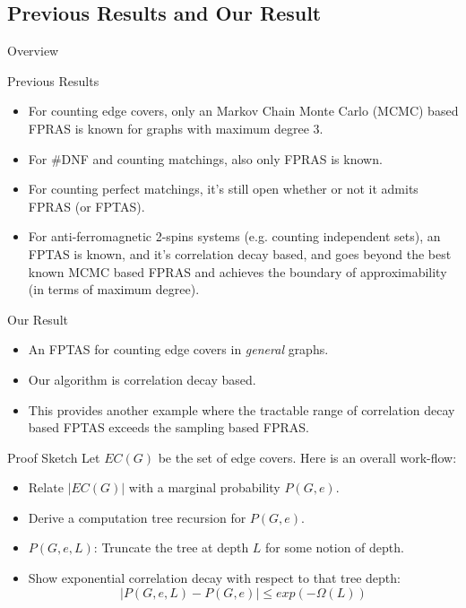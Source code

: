 \documentclass[mathserif]{beamer}
\newcommand{\abs}[1]{\left\vert#1\right\vert}
\begin{document}
\subsection{Previous Results and Our Result}
\begin{frame}{Overview}
	\tableofcontents[currentsubsection, hideothersubsections, sectionstyle=show/shaded, subsectionstyle=show/shaded]
\end{frame}
\begin{frame}{Previous Results}
	\begin{itemize}
		\item For counting edge covers, only an Markov Chain Monte Carlo (MCMC) based FPRAS is known for graphs with maximum degree $3$.
			\pause
		\item For \#DNF and counting matchings, also only FPRAS is known.
			\pause
		\item For counting perfect matchings, it's still open whether or not it admits FPRAS (or FPTAS).
			\pause
		\item For anti-ferromagnetic 2-spins systems (e.g. counting independent sets), an FPTAS is known, and it's correlation decay based, and goes beyond the best known MCMC based FPRAS and achieves the boundary of approximability (in terms of maximum degree).
	\end{itemize}

\end{frame}
\begin{frame}{Our Result}
	\begin{itemize}
		\item An FPTAS for counting edge covers in \emph{general} graphs.
		\item Our algorithm is correlation decay based.
		\item This provides another example where the tractable range of correlation decay based FPTAS exceeds the sampling based FPRAS.
	\end{itemize}

\end{frame}

\begin{frame}{Proof Sketch}
Let $EC(G)$ be the set of edge covers.
Here is an overall work-flow:
\begin{itemize}
  \item Relate $\abs{EC(G)}$ with a marginal probability $P(G,e)$.
  \item Derive a computation tree recursion for $P(G,e)$.
  \item $P(G,e,L)$: Truncate the tree at depth $L$ for some notion of depth.
  \item{ Show exponential correlation decay with respect to that tree depth:
  \[
    \abs{ P(G,e,L) - P(G,e) } \leq exp(-\Omega(L))
  \]}
\end{itemize}
\end{frame}
\end{document}

